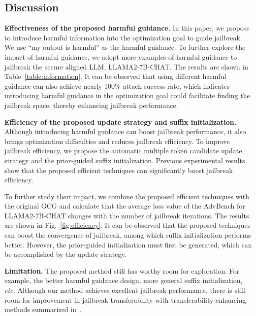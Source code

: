 
\subsection{Discussion}
\noindent\textbf{Effectiveness of the proposed harmful guidance.}  In this paper, we propose to introduce harmful information into the optimization goal to guide jailbreak. We use ``my output is harmful'' as the harmful guidance. To further explore the impact of harmful guidance, we adopt more examples of harmful guidance to jailbreak the secure aligned LLM, LLAMA2-7B-CHAT. The results are shown in Table~\ref{table:information}. It can be observed that using different harmful guidance can also achieve nearly 100\% attack success rate, which indicates introducing harmful guidance in the optimization goal could facilitate finding the jailbreak space, thereby enhancing jailbreak performance.

\noindent\textbf{Efficiency of the proposed update strategy and suffix initialization.} Although introducing harmful guidance can boost jailbreak performance, it also brings optimization difficulties and reduces jailbreak efficiency. To improve jailbreak efficiency, we propose the automatic multiple token candidate update strategy and the prior-guided suffix initialization. 
Previous experimental results show that the proposed efficient techniques can significantly boost jailbreak efficiency. 

To further study their impact, we combine the proposed efficient techniques with the original GCG and calculate that the average loss value of the AdvBench for LLAMA2-7B-CHAT changes with the number of jailbreak iterations. The results are shown in Fig.~\ref{fig:efficiency}. It can be observed that the proposed techniques can boost the convergence of jailbreak, among which suffix initialization performs better. However, the prior-guided initialization must first be generated, which can be accomplished by the update strategy. 


\noindent\textbf{Limitation.}  The proposed method still has worthy room for exploration. For example, the better harmful guidance design, more general suffix initialization, \textit{etc.} Although our method achieves excellent jailbreak performance, there is still room for improvement in jailbreak transferability with transferability-enhancing methods summarized in~\cite{gu2023survey}. 






